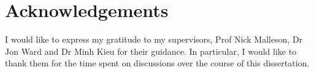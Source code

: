 \documentclass[11pt, twoside, a4paper]{report}
\begin{document}
\chapter*{\centering Acknowledgements}

I would like to express my gratitude to my supervisors, Prof Nick Malleson, Dr
Jon Ward and Dr Minh Kieu for their guidance.
In particular, I would like to thank them for the time spent on discussions over
the course of this dissertation.

\tableofcontents
\listoffigures
\listoftables




\end{document}

